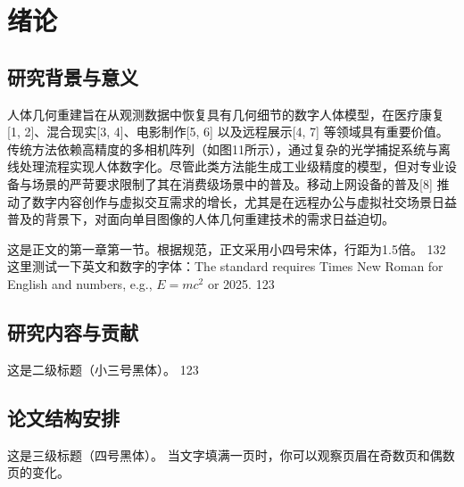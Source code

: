 \chapter{绪论}
\section{研究背景与意义}

人体几何重建旨在从观测数据中恢复具有几何细节的数字人体模型，在医疗康复[1, 2]、混合现实[3, 4]、电影制作[5, 6] 以及远程展示[4, 7] 等领域具有重要价值。传统方法依赖高精度的多相机阵列（如图1­1所示），通过复杂的光学捕捉系统与离线处理流程实现人体数字化。尽管此类方法能生成工业级精度的模型，但对专业设备与场景的严苛要求限制了其在消费级场景中的普及。移动上网设备的普及[8] 推动了数字内容创作与虚拟交互需求的增长，尤其是在远程办公与虚拟社交场景日益普及的背景下，对面向单目图像的人体几何重建技术的需求日益迫切。

这是正文的第一章第一节。根据规范，正文采用小四号宋体，行距为1.5倍\cite{Durham_2017,18,durhamAircraftControlAllocation2017,RN108,RN166,RN172,RN50,RN44,RN40,RN35}。
132
这里测试一下英文和数字的字体：The standard requires Times New Roman for English and numbers, e.g., $E=mc^2$ or 2025.
123

\section{研究内容与贡献}
这是二级标题（小三号黑体）。
123

\section{论文结构安排}
这是三级标题（四号黑体）。
当文字填满一页时，你可以观察页眉在奇数页和偶数页的变化。
